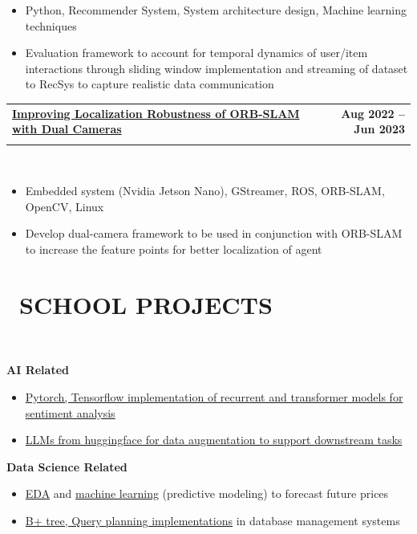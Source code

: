 \documentclass[10pt,a4paper]{article}
\makeatletter
\newcommand{\cvsectionfontsize}{11}       %
\newcommand{\cvtaglinefirstfontsize}{11}  %
\newcommand{\cvtaglinesecondfontsize}{10} %
\newcommand{\cvbulletfontsize}{10}        %
\newcommand{\cvsection}[3][.2em]{
  \vspace{-2.7em} %
  \section[#3]{\textbf{\scalebox{.68}{\faIcon{#2}}~\fontsize{\cvsectionfontsize}{\cvsectionfontsize}\selectfont\MakeUppercase{#3}}}
  \vspace{-1.8em}
  \noindent\makebox[\textwidth]{\rule{\textwidth}{0.4pt}}
  \\
  \vspace{#1} %
}
\newcommand{\cvtagline}[5][1em]{
  \vspace{-1em} %
  \noindent
  \begin{tabularx}{\textwidth}{@{}Xr@{}}
    {\fontsize{\cvtaglinefirstfontsize}{\cvtaglinefirstfontsize}\selectfont\textbf{#2}}
    &
    {\fontsize{\cvtaglinefirstfontsize}{\cvtaglinefirstfontsize}\selectfont\textbf{#3}}
    \\ %
    {\fontsize{\cvtaglinesecondfontsize}{\cvtaglinesecondfontsize}\selectfont{#4}}
    &
    {\fontsize{\cvtaglinesecondfontsize}{\cvtaglinesecondfontsize}\selectfont\textit{#5}}
    \\ %
  \end{tabularx}
  \\
  \vspace{#1} %
}
\newcommand{\cvbullets}[2][1em]{
  \vspace{-2.1em} %
  {\fontsize{\cvbulletfontsize}{\cvbulletfontsize}\selectfont
    \begin{itemize}[left=0pt,labelsep=1em]
        \setlength\itemsep{0.2em} %
        \setlength\labelwidth{1em} %
        \setlength\parskip{0pt} %
        #2
    \end{itemize}
  }
  \vspace{#1} %
}
\makeatother
\begin{document}
\cvbullets{
\item Python, Recommender System, System architecture design, Machine learning
  techniques
\item Evaluation framework to account for temporal dynamics of
  user/item interactions
  through sliding window implementation and streaming of dataset to RecSys to
capture realistic data communication }

\cvtagline{\href{https://github.com/HiIAmTzeKean/Jetson-Nano-SLAM}{Improving
Localization Robustness of ORB-SLAM with Dual Cameras}}{Aug 2022 --
Jun 2023}{NTU President Scholar (Merit) | Supervisor: Prof. Lam Siew
Kei [Assistant Chair Admission]}{}

\cvbullets{
\item Embedded system (Nvidia Jetson Nano), GStreamer, ROS, ORB-SLAM,
  OpenCV, Linux
\item Develop dual-camera framework to be used in conjunction with ORB-SLAM to
increase the feature points for better localization of agent }

\cvsection{school}{School Projects}
\vspace{1em}
\textbf{AI Related}

\cvbullets{
\item \href{https://github.com/HiIAmTzeKean/SC4002-NLP}{Pytorch,
    Tensorflow implementation of recurrent and transformer models for
  sentiment analysis}
\item \href{https://github.com/HiIAmTzeKean/SC4001-NLarge}{LLMs from
  huggingface for data augmentation to support downstream tasks}
}
\vspace{-1em}
\textbf{Data Science Related}
\vspace{1.5em}
\cvbullets{
\item
  \href{https://github.com/HiIAmTzeKean/SC1015-Car-Resale-Analysis-NTU}{EDA}
  and
  \href{https://github.com/HiIAmTzeKean/STAT4710J-Data-Science-and-Analytics-using-Python}{machine
  learning} (predictive modeling) to forecast future prices
\item
  \href{https://github.com/HiIAmTzeKean/SC3020-Database-System-Principles}{B+
  tree, Query planning implementations} in database management systems
}
\end{document}
